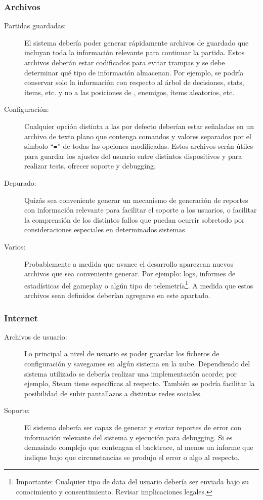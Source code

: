 \subsubsection{Archivos}
\begin{description}
\item[Partidas guardadas:] El sistema debería poder generar rápidamente archivos de guardado que incluyan toda la información relevante para continuar la partida. Estos archivos deberán estar codificados para evitar trampas y se debe determinar qué tipo de información almacenan. Por ejemplo, se podría conservar solo la información con respecto al árbol de decisiones, stats, ítems, etc. y no a las posiciones de , enemigos, ítems aleatorios, etc.

\item[Configuración:] Cualquier opción distinta a las por defecto deberían estar señaladas en un archivo de texto plano que contenga comandos y valores separados por el símbolo “\texttt{=}” de todas las opciones modificadas.
Estos archivos serán útiles para guardar los ajustes del usuario entre distintos dispositivos y para realizar tests, ofrecer soporte y debugging.

\item[Depurado:] Quizás sea conveniente generar un mecanismo de generación de reportes con información relevante para facilitar el soporte a los usuarios, o facilitar la comprensión de los distintos fallos que puedan ocurrir sobretodo por consideraciones especiales en determinados sistemas.

\item[Varios:] Probablemente a medida que avance el desarrollo aparezcan nuevos archivos que sea conveniente generar. Por ejemplo: logs, informes de estadísticas del gameplay o algún tipo de telemetría\footnote{Importante: Cualquier tipo de data del usuario debería ser enviada bajo su conocimiento y consentimiento. Revisar implicaciones legales.}. A medida que estos archivos sean definidos deberían agregarse en este apartado.
\end{description}

\subsubsection{Internet}
\begin{description}
\item[Archivos de usuario:] Lo principal a nivel de usuario es poder guardar los ficheros de configuración y savegames en algún sistema en la nube. Dependiendo del sistema utilizado se debería realizar una implementación acorde; por ejemplo, Steam tiene  específicas al respecto. También se podría facilitar la posibilidad de subir pantallazos a distintas redes sociales.

\item[Soporte:] El sistema debería ser capaz de generar y enviar reportes de error con información relevante del sistema y ejecución para debugging. Si es demasiado complejo que contengan el backtrace, al menos un informe que indique bajo que circunstancias se produjo el error o algo al respecto.
\end{description}

